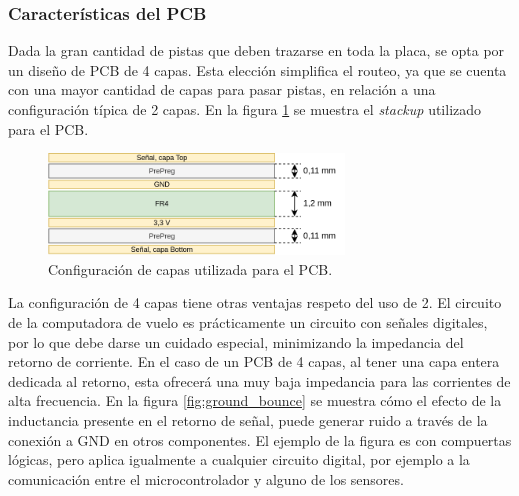 \subsubsection{Características del PCB}

Dada la gran cantidad de pistas que deben trazarse en toda la placa, se opta por un diseño de PCB de 4 capas. Esta elección simplifica el routeo, ya que se cuenta con una mayor cantidad de capas para pasar pistas, en relación a una configuración típica de 2 capas. En la figura \ref{fig:stackup} se muestra el \textit{stackup} utilizado para el PCB.%

\begin{figure}[htb]
    \centering
    \includegraphics[width=0.7\textwidth]{img/stackup.png}
    \caption{Configuración de capas utilizada para el PCB.}
    \label{fig:stackup}
\end{figure}






La configuración de 4 capas tiene otras ventajas respeto del uso de 2. El circuito de la computadora de vuelo es prácticamente un circuito con señales digitales, por lo que debe darse un cuidado especial, minimizando la impedancia del retorno de corriente. En el caso de un PCB de 4 capas, al tener una capa entera dedicada al retorno, esta ofrecerá una muy baja impedancia para las corrientes de alta frecuencia. En la figura \ref{fig:ground_bounce} se muestra cómo el efecto de la inductancia presente en el retorno de señal, puede generar ruido a través de la conexión a GND en otros componentes. El ejemplo de la figura es con compuertas lógicas, pero aplica igualmente a cualquier circuito digital, por ejemplo a la comunicación entre el microcontrolador y alguno de los sensores.


